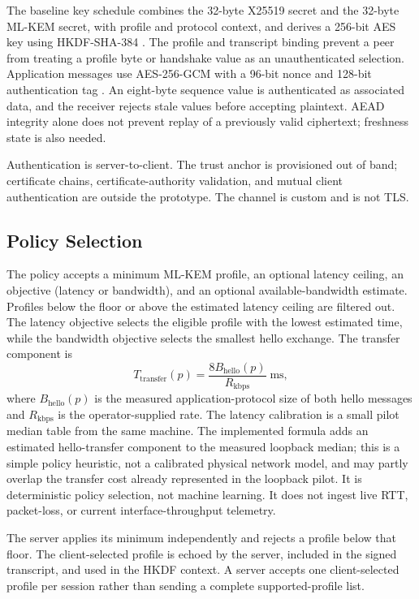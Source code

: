 \documentclass[journal]{IEEEtran}
\begin{document}
The baseline key schedule combines the 32-byte X25519 secret and the 32-byte ML-KEM secret, with profile and protocol context, and derives a 256-bit AES key using HKDF-SHA-384 \cite{rfc5869}. The profile and transcript binding prevent a peer from treating a profile byte or handshake value as an unauthenticated selection. Application messages use AES-256-GCM with a 96-bit nonce and 128-bit authentication tag \cite{nistGcm}. An eight-byte sequence value is authenticated as associated data, and the receiver rejects stale values before accepting plaintext. AEAD integrity alone does not prevent replay of a previously valid ciphertext; freshness state is also needed.

Authentication is server-to-client. The trust anchor is provisioned out of band; certificate chains, certificate-authority validation, and mutual client authentication are outside the prototype. The channel is custom and is not TLS.

\subsection{Policy Selection}
The policy accepts a minimum ML-KEM profile, an optional latency ceiling, an objective (latency or bandwidth), and an optional available-bandwidth estimate. Profiles below the floor or above the estimated latency ceiling are filtered out. The latency objective selects the eligible profile with the lowest estimated time, while the bandwidth objective selects the smallest hello exchange. The transfer component is
\begin{equation}
  T_{\mathrm{transfer}}(p) = \frac{8 B_{\mathrm{hello}}(p)}{R_{\mathrm{kbps}}} \;\mathrm{ms},
\end{equation}
where $B_{\mathrm{hello}}(p)$ is the measured application-protocol size of both hello messages and $R_{\mathrm{kbps}}$ is the operator-supplied rate. The latency calibration is a small pilot median table from the same machine. The implemented formula adds an estimated hello-transfer component to the measured loopback median; this is a simple policy heuristic, not a calibrated physical network model, and may partly overlap the transfer cost already represented in the loopback pilot. It is deterministic policy selection, not machine learning. It does not ingest live RTT, packet-loss, or current interface-throughput telemetry.

The server applies its minimum independently and rejects a profile below that floor. The client-selected profile is echoed by the server, included in the signed transcript, and used in the HKDF context. A server accepts one client-selected profile per session rather than sending a complete supported-profile list.
\end{document}
